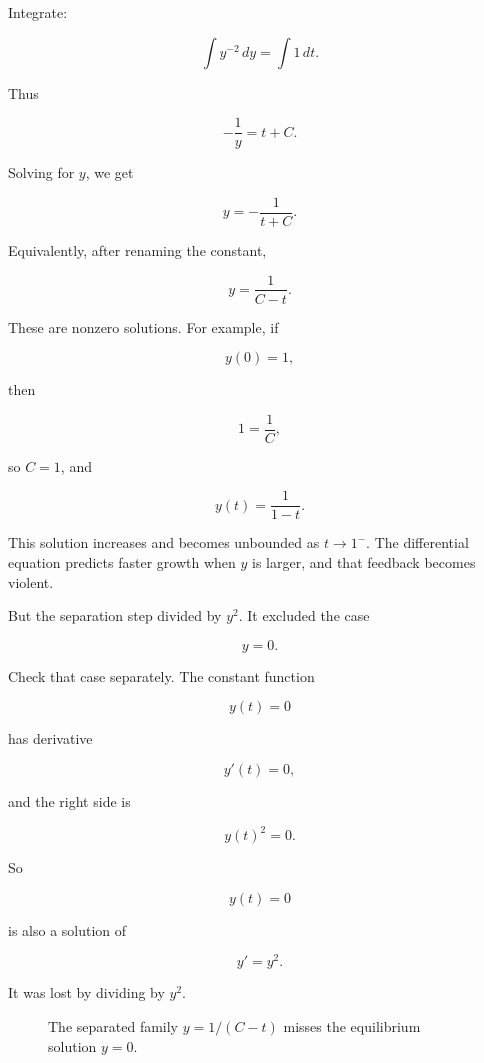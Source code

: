 Integrate:

\[
\int y^{-2}\,dy=\int 1\,dt.
\]

Thus

\[
-\frac1y=t+C.
\]

Solving for \(y\), we get

\[
y=-\frac{1}{t+C}.
\]

Equivalently, after renaming the constant,

\[
\boxed{
y=\frac{1}{C-t}.
}
\]

These are nonzero solutions.  For example, if

\[
y(0)=1,
\]

then

\[
1=\frac1C,
\]

so \(C=1\), and

\[
\boxed{
y(t)=\frac{1}{1-t}.
}
\]

This solution increases and becomes unbounded as \(t\to1^{-}\).  The differential
equation predicts faster growth when \(y\) is larger, and that feedback becomes
violent.

But the separation step divided by \(y^2\).  It excluded the case

\[
y=0.
\]

Check that case separately.  The constant function

\[
y(t)=0
\]

has derivative

\[
y'(t)=0,
\]

and the right side is

\[
y(t)^2=0.
\]

So

\[
\boxed{
y(t)=0
}
\]

is also a solution of

\[
y'=y^2.
\]

It was lost by dividing by \(y^2\).

\begin{figure}[h]
\centering
{}
\caption{The separated family \(y=1/(C-t)\) misses the equilibrium solution \(y=0\).}
\label{fig:yprime-y-squared-lost-solution}
\end{figure}

